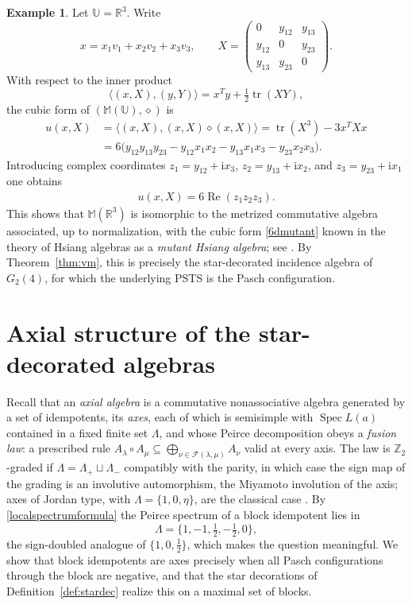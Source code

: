 \documentclass[times,11pt,reqno]{amsproc}
\theoremstyle{definition}
\newtheorem{example}[theorem]{Example}
\numberwithin{equation}{section}
\def\ualg{\mathbb{U}}
\newcommand{\fusion}{\mathscr{F}}
\DeclareMathOperator{\tr}{tr}
\DeclareMathOperator{\Spec}{Spec}
\def\ualg{\mathbb{U}}
\def\malg{\mathbb{M}}
\newcommand{\vm}[1]{\malg(#1)}
\begin{document}
\begin{example}\label{ex:mutant}
Let $\ualg=\mathbb R^3$. Write
$$
x=x_1v_1+x_2v_2+x_3v_3,
\qquad
X=
\begin{pmatrix}
0&y_{12}&y_{13}\\
y_{12}&0&y_{23}\\
y_{13}&y_{23}&0
\end{pmatrix}.
$$
With respect to the inner product
$$
\langle(x,X),(y,Y)\rangle
=
x^Ty+\tfrac12\tr(XY),
$$
the cubic form of $(\vm{\ualg},\diamond)$ is
$$
\begin{aligned}
u(x,X)
&=
\langle(x,X),(x,X)\diamond(x,X)\rangle=
\tr(X^3)-3x^TXx\\
&=
6\bigl(
y_{12}y_{13}y_{23}
-y_{12}x_1x_2
-y_{13}x_1x_3
-y_{23}x_2x_3
\bigr).
\end{aligned}
$$
Introducing complex coordinates
$z_1=y_{12}+\mathrm{i}x_3$, $z_2=y_{13}+\mathrm{i}x_2$, and $z_3=y_{23}+\mathrm{i}x_1$
one obtains
\begin{align}\label{6dmutant}
u(x,X)=6\operatorname{Re}(z_1z_2z_3).
\end{align}
This shows that $\vm{\mathbb R^3}$ is isomorphic to the metrized commutative
algebra associated, up to normalization, with the cubic form \eqref{6dmutant} known in the theory of Hsiang algebras as a \emph{mutant Hsiang
algebra}; see \cite{Nadirashvili-Tkachev-Vladuts,Fox-Tkachev}. By Theorem~\ref{thm:vm}, this is precisely the star-decorated incidence
algebra of $G_2(4)$, for which the underlying PSTS is the Pasch configuration.
\end{example}


\section{Axial structure of the star-decorated algebras}\label{sec:axial}

Recall that an \emph{axial algebra} is a commutative nonassociative
algebra generated by a set of idempotents, its \emph{axes}, each of which
is semisimple with $\Spec L(a)$ contained in a fixed finite set
$\Lambda$, and whose Peirce decomposition obeys a \emph{fusion law}: a
prescribed rule
$
A_\lambda\circ A_\mu\subseteq\bigoplus_{\nu\in\fusion(\lambda,\mu)}A_\nu
$
valid at every axis. The law is $\mathbb Z_2$-graded if
$\Lambda=\Lambda_+\sqcup\Lambda_-$ compatibly with the parity, in which
case the sign map of the grading is an involutive automorphism, the
Miyamoto involution of the axis; axes of Jordan type, with
$\Lambda=\{1,0,\eta\}$, are the classical case
\cite{Hall-Rehren-Shpectorov,Matsuo-3transposition}. By
\eqref{localspectrumformula} the Peirce spectrum of a block idempotent
lies in
$$
\Lambda=\{1,-1,\tfrac12,-\tfrac12,0\},
$$
the sign-doubled analogue of $\{1,0,\tfrac12\}$, which makes the question
meaningful. We show that block idempotents are axes precisely when all
Pasch configurations through the block are negative, and that the star
decorations of Definition~\ref{def:stardec} realize this on a maximal
set of blocks.
\end{document}

